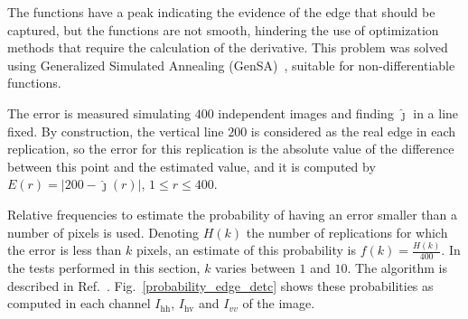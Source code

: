 \documentclass[remotesensing,article,submit,moreauthors,pdftex]{Definitions/mdpi}
\begin{document}
The functions have a peak indicating the evidence of the edge that should be captured, but the functions are not smooth, hindering the use of optimization methods that require the calculation of the derivative.
This problem was solved using Generalized Simulated Annealing (GenSA)~\cite{xgsh}, suitable for non-differentiable functions.
    
The error is measured simulating $400$ independent images and finding $\widehat\jmath$ in a line fixed.
By construction, the vertical line $200$ is considered as the real edge in each replication, so the error for this replication is the absolute value of the difference between this point and the estimated value, and it is computed by $E(r) = |200 - \widehat{\jmath}(r)|$, $1\leq r \leq 400$.

Relative frequencies to estimate the probability of having an error smaller than a number of pixels is used. 
Denoting $H(k)$ the number of replications for which the error is less than $k$ pixels, an estimate of this probability is $f(k)=\frac{H(k)}{400}$. 
In the tests performed in this section, $k$ varies between $1$ and $10$. 
The algorithm is described in Ref.~\cite{fbgm}.
Fig.~\ref{probability_edge_detc} shows these probabilities as computed in each channel $I_\text{hh}$, $I_\text{hv}$ and $I_{vv}$ of the image. 
  
\end{document}
